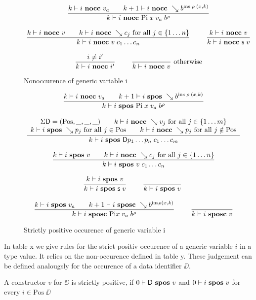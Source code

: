 \newcommand{\nocc}[3]{#1\vdash#2\mbox{ \textbf{nocc} }#3}

\begin{figure}
\begin{gather*}
\nru{}
{\nocc{k}{i}{v_a} \qquad \nocc{k+1}{i}{\wh \cl{b}{\ins \; \rho \; (x,k)}}}
{\nocc{k}{i}{\vpi \; x \; v_a \; \cl{b}{\rho}}  }
\\[2ex]
\nru{}
{\nocc{k}{i}{v} \qquad \nocc{k}{i}{\wh c_j} \mbox{ for all } j \in \{1 \ldots n \}}
{\nocc{k}{i}{v \; c_1 \ldots c_n}}
\qquad
\nru{}
{\nocc{k}{i}{v}}
{\nocc{k}{i}{\s v}}
\\[2ex]
\nru{}
{i \neq i'}
{\nocc{k}{i}{i'}}
\qquad
\nrux{}
{}
{\nocc{k}{i}{v}}
{\mbox{otherwise}}
\end{gather*}
\caption{Nonoccurence of generic variable i}
\end{figure}

\begin{figure}
\begin{gather*}
\nru{}
{ \nocc{k}{i}{v_a} \qquad \spos{k+1}{i}{\wh \cl{b}{\ins \; \rho \; (x,k)}}}
{\spos{k}{i}{\vpi \; x \; v_a \; \cl{b}{\rho}}  }
\\[2ex]
\ndru{}
{\Sig \DD = (\mbox{Pos},\_,\_,\_) \qquad \nocc{k}{i}{\wh v_j} \mbox{ for all } j \in \{1 \ldots m \}} 
{\spos{k}{i}{\wh p_j} \mbox{ for all } j \in \mbox{Pos} \qquad \nocc{k}{i}{\wh p_j} \mbox{ for all } j \notin \mbox{Pos} } 
{\spos{k}{i}{\DD p_1 \ldots p_n \; c_1 \ldots c_m}}
\\[2ex]
\nru{}
{\spos{k}{i}{v} \qquad \nocc{k}{i}{\wh c_j} \mbox{ for all } j \in \{1 \ldots n \}}
{\spos{k}{i}{v \; c_1 \ldots c_n}}
\\[2ex]
\nru{}
{\spos{k}{i}{v}}
{\spos{k}{i}{\s v}}
\qquad
\nrux{}
{}
{\spos{k}{i}{v}}
\\[2ex]
\nru{}
{\spos{k}{i}{v_a} \qquad \sposc{k+1}{i}{\wh \cl{b}{\ins \rho (x,k)}}}
{\sposc{k}{i}{\vpi x \; v_a \; \cl{b}{\rho}}}
\qquad
\nru{}
{}
{\sposc{k}{i}{v}}
\end{gather*}
\caption{Strictly positive occurence of generic variable i}
\end{figure}

In table x we give rules for the strict positiv occurence of a generic variable $i$ in a type value.
It relies on the non-occurence defined in table y.
These judgement can be defined analougsly for the occurence of a data identifier $\DD$.
\begin{definition}
A constructor $v$ for $\DD$ is strictly positive, if $0\vdash\mathsf{D}\mbox{ \textbf{spos} }v$ and 
$0\vdash i\mbox{ \textbf{spos} }v$ for every $i \in \mbox{Pos}\; {\DD}$  
\end{definition}

